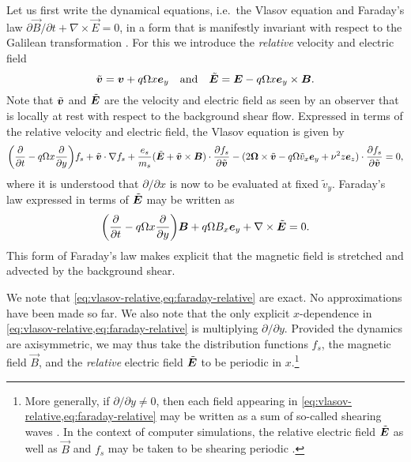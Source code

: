 \documentclass[aps,pre,notitlepage,amsmath,amssymb,amsfonts,nobibnotes,nofootinbib,superscriptaddress]{revtex4-1}
\begin{document}
Let us first write the dynamical equations, i.e.\ the Vlasov equation
 and Faraday's law
$\partial\vec{B}/\partial{}t+\nabla\times\vec{E}=0$, in a form that is
manifestly invariant with respect to the Galilean transformation
. For this we introduce the \emph{relative}
velocity and electric field
\begin{equation}
  \label{eq:relative-quantities}
  \tvec{v} = \vec{v} + q\Omega x\ey
  \quad\textrm{and}\quad
  \tvec{E} = \vec{E} - q\Omega x\ey\times\vec{B}.
\end{equation}
Note that $\tilde{\bm{v}}$ and $\tilde{\bm{E}}$ are the velocity and electric field as
seen by an observer that is locally at rest with respect to the background
shear flow. Expressed in terms of the relative velocity and electric field,
the Vlasov equation is given by
\begin{equation}
  \label{eq:vlasov-relative}
  \left(\pder{}{t} - q\Omega x\pder{}{y}\right) f_s
  + \tilde{\vec{v}}\cdot\nabla f_s
  + \frac{\qs}{m_s}(\tilde{\vec{E}} + \tilde{\vec{v}}\times\vec{B})
  \cdot\pder{f_s}{\tilde{\vec{v}}}
  - (2\vec{\Omega}\times\tvec{v} - q\Omega\tilde{v}_x\ey + \vfreq^2 z\ez)
  \cdot\pder{f_s}{\tilde{\vec{v}}} = 0,
\end{equation}
where it is understood that $\partial/\partial{}x$ is now to be evaluated at
fixed $\tilde{v}_y$. Faraday's law expressed in terms of $\tilde{\bm{E}}$ may be
written as
\begin{equation}
  \label{eq:faraday-relative}
  \left(\pder{}{t} - q\Omega x\pder{}{y}\right)
  \vec{B} + q\Omega B_x\ey + \nabla\times\tilde{\vec{E}} = 0.
\end{equation}
This form of Faraday's law makes explicit that the magnetic field is stretched
and advected by the background shear.

We note that \cref{eq:vlasov-relative,eq:faraday-relative} are exact. No
approximations have been made so far. We also note that the only explicit
$x$-dependence in \cref{eq:vlasov-relative,eq:faraday-relative} is multiplying
$\partial/\partial{}y$. Provided the dynamics are axisymmetric, we may thus
take the distribution functions $f_s$, the magnetic field $\vec{B}$, and the
\emph{relative} electric field $\tilde{\bm{E}}$ to be periodic in $x$.\footnote{More
  generally, if $\partial/\partial{}y\ne0$, then each field appearing in
  \cref{eq:vlasov-relative,eq:faraday-relative} may be written as a sum of
  so-called shearing waves \citep{Thomson1887,Goldreich1965}. In the context
  of computer simulations, the relative electric field $\tilde{\bm{E}}$ as well as
  $\vec{B}$ and $f_s$ may be taken to be shearing periodic
  \citep{Lees1972,Hawley1995}.}
\end{document}
